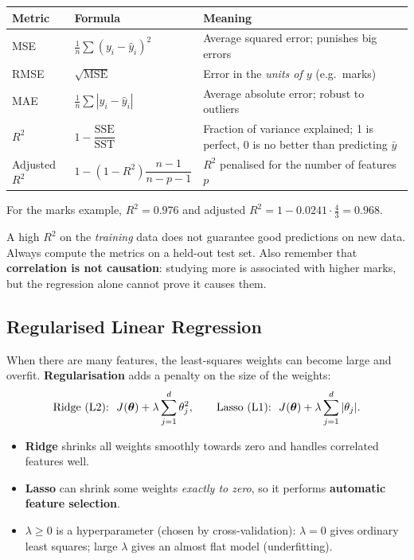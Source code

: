 \begin{center}
\begin{tabular}{@{}p{3.1cm}p{5.1cm}p{5.6cm}@{}}
\toprule
\textbf{Metric} & \textbf{Formula} & \textbf{Meaning}\\
\midrule
MSE & $\frac1n\sum(y_i-\hat y_i)^2$ & Average squared error; punishes big errors\\
RMSE & $\sqrt{\text{MSE}}$ & Error in the \emph{units of $y$} (e.g.\ marks)\\
MAE & $\frac1n\sum|y_i-\hat y_i|$ & Average absolute error; robust to outliers\\
$R^2$ & $1-\dfrac{\text{SSE}}{\text{SST}}$ & Fraction of variance explained; 1 is perfect, 0 is no better than predicting $\bar y$\\
Adjusted $R^2$ & $1-(1-R^2)\dfrac{n-1}{n-p-1}$ & $R^2$ penalised for the number of features $p$\\
\bottomrule
\end{tabular}
\end{center}

For the marks example, $R^2=0.976$ and adjusted $R^2=1-0.0241\cdot\frac{4}{3}=0.968$.

\begin{warning}
A high $R^2$ on the \emph{training} data does not guarantee good predictions on new data. Always compute the metrics on a held-out test set. Also remember that \textbf{correlation is not causation}: studying more is associated with higher marks, but the regression alone cannot prove it causes them.
\end{warning}

\subsection{Regularised Linear Regression}

When there are many features, the least-squares weights can become large and overfit. \textbf{Regularisation} adds a penalty on the size of the weights:
\[
\text{Ridge (L2):}\ \ J(\vect\theta)+\lambda\sum_{j=1}^{d}\theta_j^2,\qquad
\text{Lasso (L1):}\ \ J(\vect\theta)+\lambda\sum_{j=1}^{d}|\theta_j| .
\]
\begin{itemize}
  \item \textbf{Ridge} shrinks all weights smoothly towards zero and handles correlated features well.
  \item \textbf{Lasso} can shrink some weights \emph{exactly to zero}, so it performs \textbf{automatic feature selection}.
  \item $\lambda\ge0$ is a hyperparameter (chosen by cross-validation): $\lambda=0$ gives ordinary least squares; large $\lambda$ gives an almost flat model (underfitting).
\end{itemize}

